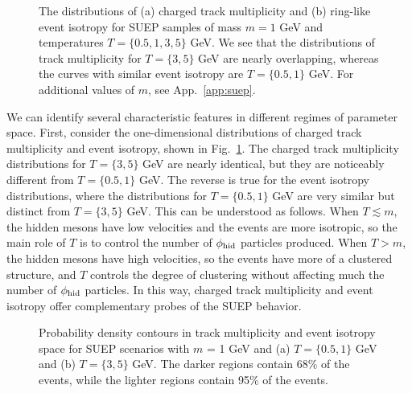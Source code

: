 \documentclass[letterpaper,11pt]{article}
\DeclareRobustCommand{\App}[1]{App.~\ref{#1}}
\DeclareRobustCommand{\Fig}[1]{Fig.~\ref{#1}}
\begin{document}
\begin{figure}[t!]
%
\centering
{}
     \hfill
{}
\caption{The distributions of (a) charged track multiplicity and (b) ring-like event isotropy for SUEP samples of mass $m = 1$ GeV and temperatures $T = \{0.5, 1, 3, 5\}$ GeV. 
%
We see that the distributions of track multiplicity for $T = \{3,5\}$ GeV are nearly overlapping, whereas the curves with similar event isotropy are $T = \{0.5, 1\}$ GeV.
%
For additional values of $m$, see \App{app:suep}.}
%
\label{fig:smallMassSUEP}
\end{figure}


We can identify several characteristic features in different regimes of parameter space. 
%
First, consider the one-dimensional distributions of charged track multiplicity and event isotropy, shown in \Fig{fig:smallMassSUEP}.
%
The charged track multiplicity distributions for $T = \{3, 5\}$ GeV are nearly identical, but they are noticeably different from $T = \{0.5, 1\}$ GeV.
%
The reverse is true for the event isotropy distributions, where the  distributions for $T = \{0.5, 1\}$ GeV are very similar but distinct from $T = \{3, 5\}$ GeV.
%
This can be understood as follows.
%
When $T \lesssim m$, the hidden mesons have low velocities and the events are more isotropic, so the main role of $T$ is to control the number of $\phi_{\rm hid}$ particles produced.
%
When $T > m$, the hidden mesons have high velocities, so the events have more of a clustered structure, and $T$ controls the degree of clustering without affecting much the number of $\phi_{\rm hid}$ particles.
%
In this way, charged track multiplicity and event isotropy offer complementary probes of the SUEP behavior.


\begin{figure}[t!]
%
\centering
{}
     \hfill
{}
\caption{Probability density contours in track multiplicity and event isotropy space for SUEP scenarios with $m$ = 1 GeV and (a) $T = \{0.5, 1\}$ GeV and (b) $T =  \{3, 5\}$ GeV.
%
The darker regions contain 68\% of the events, while the lighter regions contain 95\% of the events.}
%
\label{fig:smallMassSUEP2d}
\end{figure}
\end{document}
